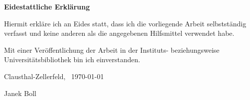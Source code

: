 \makeatletter

\cleardoublepage

\thispagestyle{empty}
\hskip 0mm
\vfill

\begin{center}
    \sffamily\bfseries\large Eidestattliche Erklärung
\end{center}

\bigskip\noindent Hiermit erkläre ich an Eides statt, dass ich die vorliegende Arbeit selbstständig verfasst und keine anderen als die angegebenen Hilfsmittel verwendet habe.\par
Mit einer Veröffentlichung der Arbeit in der Instituts- beziehungsweise Universitätsbibliothek bin ich einverstanden.\par

\bigskip\noindent Clausthal-Zellerfeld,~ \today\par
\vskip 10mm
\hfill \hrulefill\par
\hfill Janek Boll
\makeatother